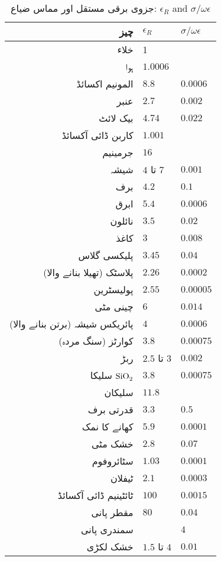 {\renewcommand{\arraystretch}{1.2}
\begin{table}
\caption*{جزوی برقی مستقل اور مماس ضیاع: $\epsilon_R$ and $\sigma/\omega \epsilon$}
\centering
\begin{tabular}{r | l | l}
\hline
چیز & $\epsilon_R$ & $\sigma/\omega \epsilon$\\
\hline
خلاء & 1 &  \\
ہوا&  $\num{1.0006}$&  \\
المونیم اکسائڈ  & $\num{8.8}$ & $\num{0.0006}$\\
عنبر  & $\num{2.7}$& $\num{0.002}$ \\
بیک لائٹ  & $\num{4.74}$& $\num{0.022}$ \\
کاربن ڈائی آکسائڈ &$\num{1.001}$&\\
جرمینیم&$\num{16}$&\\
شیشہ & $4$ تا $7$ & $\num{0.001}$\\
برف & $\num{4.2}$& $\num{0.1}$ \\
ابرق   & $\num{5.4}$ & $\num{0.0006}$\\
نائلون  & $\num{3.5}$ & $\num{0.02}$\\
کاغذ  & $\num{3}$ & $\num{0.008}$\\
پلیکسی گلاس  & $\num{3.45}$ & $\num{0.04}$\\
پلاسٹک (تھیلا بنانے والا)   & $\num{2.26}$ & $\num{0.0002}$ \\
پولیسٹرین & $\num{2.55}$ & $\num{0.00005}$ \\
چینی مٹی & $\num{6}$ & $\num{0.014}$ \\
پائریکس شیشہ (برتن بنانے والا)  & $\num{4}$& $\num{0.0006}$ \\
کوارٹز (سنگ مردہ)  & $\num{3.8}$ & $\num{0.00075}$ \\
ربڑ & $2.5$ تا $3$ & $\num{0.002}$\\
سلیکا  $\ce{SiO2}$ & $\num{3.8}$ & $\num{0.00075}$ \\
سلیکان& $\num{11.8}$ &  \\
قدرتی برف& $\num{3.3}$ & $\num{0.5}$ \\
کھانے کا نمک& $\num{5.9}$ & $\num{0.0001}$ \\
خشک مٹی& $\num{2.8}$ & $\num{0.07}$ \\
سٹائروفوم  & $\num{1.03}$ & $\num{0.0001}$ \\
ٹیفلان & $\num{2.1}$ & $\num{0.0003}$ \\
ٹائٹینیم ڈائی آکسائڈ & $\num{100}$ & $\num{0.0015}$ \\
مقطر پانی & $\num{80}$ & $\num{0.04}$ \\
سمندری پانی&  & $\num{4}$ \\
خشک لکڑی&$1.5$ تا $4$ & $\num{0.01}$ \\
\end{tabular}
\label{جدول_جدول_جزوی_برقی_مستقل_زاویہ_ضیاع}
\end{table}
}
